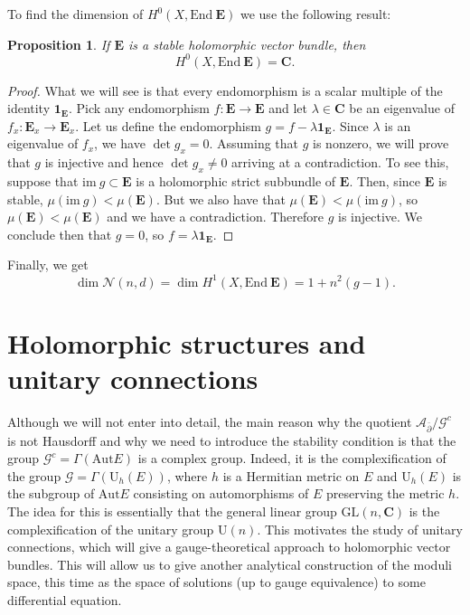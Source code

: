 \documentclass[12pt,a4paper]{book}
\newtheorem{prop}[thm]{Proposition}
\theoremstyle{definition} \newtheorem{defn}[thm]{Definition}
\theoremstyle{definition} \newtheorem{ejemplo}[thm]{Example}
\theoremstyle{remark} \newtheorem{rem}[thm]{Remark}
\def\AA{\mathscr{A}}
\def\GG{\mathscr{G}}
\def\CC{\mathbf{C}}
\def\id{\mathbf{1}}
\def\im{\mathrm{im}\ }
\def\End{\mathrm{End}}
\def\Aut{\mathrm{Aut}}
\def\UU{\mathrm{U}}
\def\Bun{\mathscr{N}}
\def\delbar{\bar{\partial}}
\newcommand{\ve}[1]{\mathbf{#1}}
\begin{document}
	   To find the dimension of $H^0(X,\End\ \ve{E})$ we use the following result:
	   \begin{prop}
	     If $\ve{E}$ is a stable holomorphic vector bundle, then
	     \begin{equation*}
	       H^0(X,\End\ \ve{E})=\CC.
	     \end{equation*}
	   \end{prop}
	   \begin{proof}
	     What we will see is that every endomorphism is a scalar multiple of the identity $\id_{\ve{E}}$. Pick any endomorphism $f:\ve{E}\rightarrow \ve{E}$ and let $\lambda \in \CC$ be an eigenvalue of $f_x:\ve{E}_x \rightarrow \ve{E}_x$. Let us define the endomorphism $g=f-\lambda \id_{\ve{E}}$. Since $\lambda$ is an eigenvalue of $f_x$, we have $\det g_x=0$. 
	     Assuming that $g$ is nonzero, we will prove that $g$ is injective and hence $\det g_x\neq 0$ arriving at a contradiction.
	     To see this, suppose that $\im g \subset \ve{E}$ is a holomorphic strict subbundle of $\ve{E}$. Then, since $\ve{E}$ is stable, $\mu(\im g) < \mu(\ve{E})$. But we also have that $\mu(\ve{E})<\mu(\im g)$, so $\mu(\ve{E})<\mu(\ve{E})$ and we have a contradiction. Therefore $g$ is injective.	     
	     We conclude then that $g=0$, so $f=\lambda\id_{\ve{E}}$.
	   \end{proof}

	   Finally, we get
	   \begin{equation*}
	     \dim \Bun(n,d)=\dim H^1(X,\End\ \ve{E})= 1+n^2(g-1).
	   \end{equation*}

	   \section{Holomorphic structures and unitary connections}
	   Although we will not enter into detail, the main reason why the quotient $\AA_{\delbar}/\GG^c$ is not Hausdorff and why we need to introduce the stability condition is that the group $\GG^c=\Gamma(\Aut E)$ is a complex group. Indeed, it is the complexification of the group $\GG=\Gamma(\UU_h(E))$, where $h$ is a Hermitian metric on $E$ and $\UU_h(E)$ is the subgroup of $\Aut E$ consisting on automorphisms of $E$ preserving the metric $h$. The idea for this is essentially that the general linear group $\mathrm{GL}(n,\CC)$ is the complexification of the unitary group $\mathrm{U}(n)$. This motivates the study of unitary connections,
which will give a gauge-theoretical approach to holomorphic vector bundles. This will allow us to give another analytical construction of the moduli space, this time as the space of solutions (up to gauge equivalence) to some differential equation.
\end{document}
